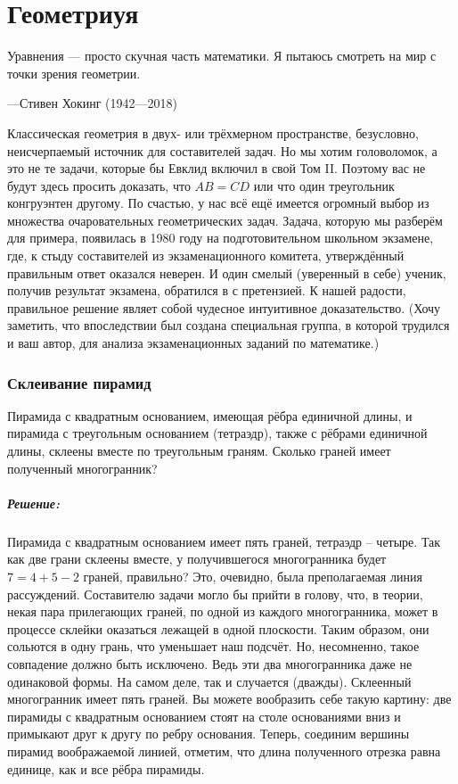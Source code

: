 \chapter*{Геометриуя}

\epigraph{Уравнения --- просто скучная часть математики.
Я пытаюсь смотреть на мир с точки зрения геометрии.}{---Стивен Хокинг (1942---2018)}

Классическая геометрия в двух- или трёхмерном пространстве, безусловно, неисчерпаемый источник для составителей задач.
Но мы хотим головоломок, а это не те задачи, которые бы Евклид включил в свой Том II.
Поэтому вас не будут здесь просить доказать, что $AB=CD$ или что один треугольник конгруэнтен другому.
По счастью, у нас всё ещё имеется огромный выбор из множества очаровательных геометрических задач.
Задача, которую мы разберём для примера, появилась в 1980 году на подготовительном  школьном экзамене, %
где, к стыду составителей из экзаменационного комитета, %
утверждённый правильным ответ оказался неверен.
И один смелый (уверенный в себе) ученик, получив результат экзамена, обратился в %
с претензией.
К нашей радости, %
правильное решение являет собой  чудесное интуитивное доказательство.
(Хочу заметить, что впоследствии был создана специальная группа, в которой  трудился и ваш автор, для анализа экзаменационных заданий по математике.)


\subsection*{Склеивание пирамид}%


Пирамида с квадратным основанием, имеющая рёбра единичной длины, и пирамида с треугольным основанием (тетраэдр), также с рёбрами единичной длины, склеены вместе по треугольным граням.
  Сколько граней имеет полученный многогранник?


\paragraph{Решение:}

Пирамида с квадратным основанием имеет пять граней, тетраэдр -- четыре.
Так как две грани склеены вместе, у получившегося многогранника будет $7=4+5-2$ граней, правильно?
Это, очевидно, была преполагаемая линия рассуждений.
Составителю задачи могло бы прийти в голову, что, в теории, некая пара прилегающих граней, по одной из каждого многогранника, может в процессе склейки оказаться лежащей в одной плоскости.
Таким образом, они сольются в одну грань, что уменьшает наш подсчёт. %
Но, несомненно, такое совпадение должно быть исключено.
Ведь эти два многогранника даже не одинаковой формы.
   На самом деле, так и случается (дважды).
Склеенный многогранник имеет пять граней.
Вы можете вообразить себе такую картину:  две пирамиды с квадратным основанием стоят на столе основаниями вниз и примыкают друг к другу по ребру основания.
Теперь,
соединим вершины пирамид воображаемой линией, отметим, что длина полученного отрезка равна единице, как и все рёбра пирамиды.

